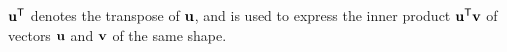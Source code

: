 \documentclass[twoside]{article}
\newcommand\discard[1]{}
\begin{document}
$\mathbf{u}^{\sf T}$ denotes the transpose of $\mathbf{u}$, and is used to
express the inner product $\mathbf{u}^{\sf T} \mathbf{v}$ of vectors $\mathbf{u}$ and
$\mathbf{v}$ of the same shape.

%
\discard{
    \color{gray!30!white} If $\mat u = [u_a]_{a \in A}$ is a vector over $A$ and $\mat v = [v_b]_{b \in B}$ is a vector over $B$, then $\mat u \mathbin{\otimes} \mat v := [ u_a \cdot v_b ]_{a \in A, b \in B}$ is a vector over $A \times B$. }
\end{document}
